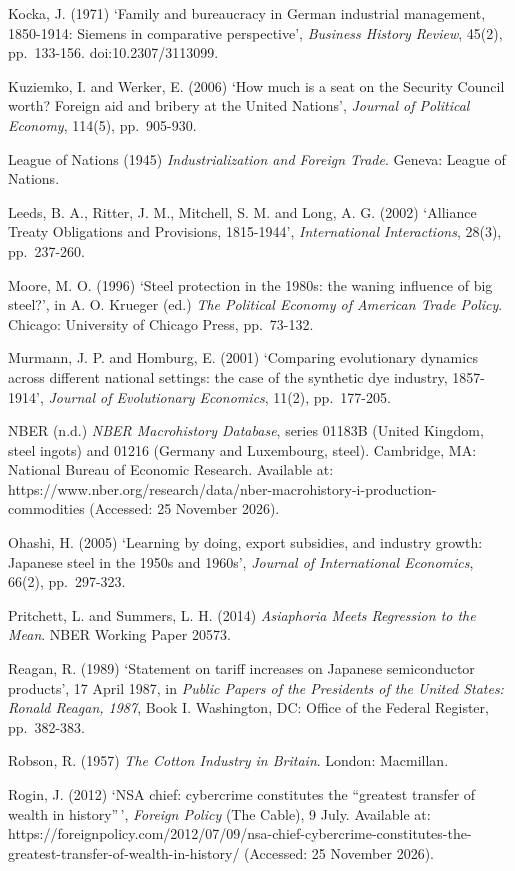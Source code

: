 Kocka, J. (1971) `Family and bureaucracy in German industrial
management, 1850-1914: Siemens in comparative perspective',
\emph{Business History Review}, 45(2), pp.~133-156. doi:10.2307/3113099.

Kuziemko, I. and Werker, E. (2006) `How much is a seat on the Security
Council worth? Foreign aid and bribery at the United Nations',
\emph{Journal of Political Economy}, 114(5), pp.~905-930.

League of Nations (1945) \emph{Industrialization and Foreign Trade}.
Geneva: League of Nations.

Leeds, B. A., Ritter, J. M., Mitchell, S. M. and Long, A. G. (2002)
`Alliance Treaty Obligations and Provisions, 1815-1944',
\emph{International Interactions}, 28(3), pp.~237-260.

Moore, M. O. (1996) `Steel protection in the 1980s: the waning influence
of big steel?', in A. O. Krueger (ed.) \emph{The Political Economy of
American Trade Policy}. Chicago: University of Chicago Press,
pp.~73-132.

Murmann, J. P. and Homburg, E. (2001) `Comparing evolutionary dynamics
across different national settings: the case of the synthetic dye
industry, 1857-1914', \emph{Journal of Evolutionary Economics}, 11(2),
pp.~177-205.

NBER (n.d.) \emph{NBER Macrohistory Database}, series 01183B (United
Kingdom, steel ingots) and 01216 (Germany and Luxembourg, steel).
Cambridge, MA: National Bureau of Economic Research. Available at:
https://www.nber.org/research/data/nber-macrohistory-i-production-commodities
(Accessed: 25 November 2026).

Ohashi, H. (2005) `Learning by doing, export subsidies, and industry
growth: Japanese steel in the 1950s and 1960s', \emph{Journal of
International Economics}, 66(2), pp.~297-323.

Pritchett, L. and Summers, L. H. (2014) \emph{Asiaphoria Meets
Regression to the Mean}. NBER Working Paper 20573.

Reagan, R. (1989) `Statement on tariff increases on Japanese
semiconductor products', 17 April 1987, in \emph{Public Papers of the
Presidents of the United States: Ronald Reagan, 1987}, Book I.
Washington, DC: Office of the Federal Register, pp.~382-383.

Robson, R. (1957) \emph{The Cotton Industry in Britain}. London:
Macmillan.

Rogin, J. (2012) `NSA chief: cybercrime constitutes the ``greatest
transfer of wealth in history''\,', \emph{Foreign Policy} (The Cable), 9
July. Available at:
https://foreignpolicy.com/2012/07/09/nsa-chief-cybercrime-constitutes-the-greatest-transfer-of-wealth-in-history/
(Accessed: 25 November 2026).

